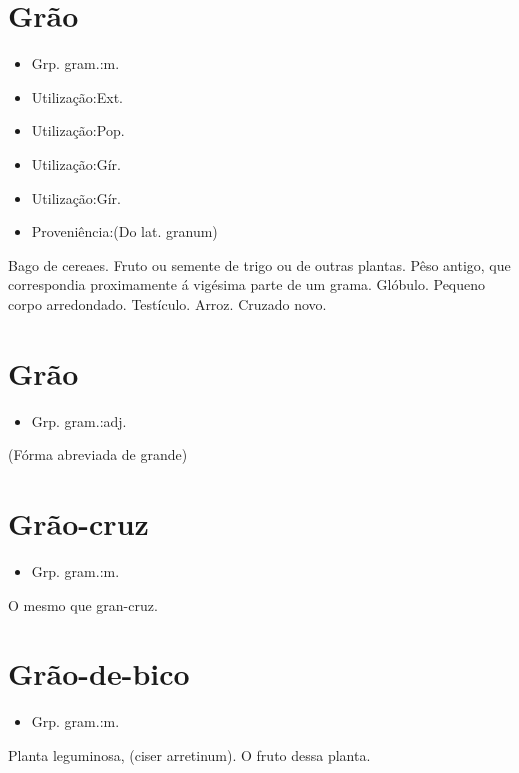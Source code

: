 \section{Grão}
\begin{itemize}
\item {Grp. gram.:m.}
\end{itemize}
\begin{itemize}
\item {Utilização:Ext.}
\end{itemize}
\begin{itemize}
\item {Utilização:Pop.}
\end{itemize}
\begin{itemize}
\item {Utilização:Gír.}
\end{itemize}
\begin{itemize}
\item {Utilização:Gír.}
\end{itemize}
\begin{itemize}
\item {Proveniência:(Do lat. \textunderscore granum\textunderscore )}
\end{itemize}
Bago de cereaes.
Fruto ou semente de trigo ou de outras plantas.
Pêso antigo, que correspondia proximamente á vigésima parte de um grama.
Glóbulo.
Pequeno corpo arredondado.
Testículo.
Arroz.
Cruzado novo.
\section{Grão}
\begin{itemize}
\item {Grp. gram.:adj.}
\end{itemize}
(Fórma abreviada de \textunderscore grande\textunderscore )
\section{Grão-cruz}
\begin{itemize}
\item {Grp. gram.:m.}
\end{itemize}
O mesmo que \textunderscore gran-cruz\textunderscore .
\section{Grão-de-bico}
\begin{itemize}
\item {Grp. gram.:m.}
\end{itemize}
Planta leguminosa, (\textunderscore ciser arretinum\textunderscore ).
O fruto dessa planta.
